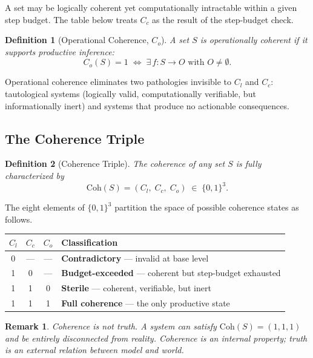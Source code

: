 \documentclass{article}
\newcommand{\CohTriple}{\mathrm{Coh}}
\newtheorem{definition}{Definition}
\newtheorem{remark}{Remark}
\begin{document}
A set may be logically coherent yet computationally intractable within
a given step budget.  The table below treats $C_c$ as the result of the
step-budget check.

\begin{definition}[Operational Coherence, $C_o$]
A set $S$ is \emph{operationally coherent} if it supports productive inference:
\[
  C_o(S) = 1 \;\iff\; \exists\, f : S \to O \text{ with } O \neq \emptyset.
\]
\end{definition}

Operational coherence eliminates two pathologies invisible to $C_l$ and $C_c$:
tautological systems (logically valid, computationally verifiable, but
informationally inert) and systems that produce no actionable consequences.

\subsection{The Coherence Triple}

\begin{definition}[Coherence Triple]
The coherence of any set $S$ is fully characterized by
\[
  \CohTriple(S) = (C_l,\; C_c,\; C_o) \;\in\; \{0,1\}^3.
\]
\end{definition}

The eight elements of $\{0,1\}^3$ partition the space of possible coherence
states as follows.

\begin{center}
\renewcommand{\arraystretch}{1.25}
\begin{tabular}{cccl}
\toprule
$C_l$ & $C_c$ & $C_o$ & Classification \\
\midrule
0 & --- & --- & \textbf{Contradictory} --- invalid at base level \\
1 & 0   & --- & \textbf{Budget-exceeded} --- coherent but step-budget exhausted \\
1 & 1   & 0   & \textbf{Sterile} --- coherent, verifiable, but inert \\
1 & 1   & 1   & \textbf{Full coherence} --- the only productive state \\
\bottomrule
\end{tabular}
\end{center}

\begin{remark}
Coherence is not truth.  A system can satisfy $\CohTriple(S) = (1,1,1)$ and
be entirely disconnected from reality.  Coherence is an \emph{internal}
property; truth is an \emph{external} relation between model and world.
\end{remark}
\end{document}
